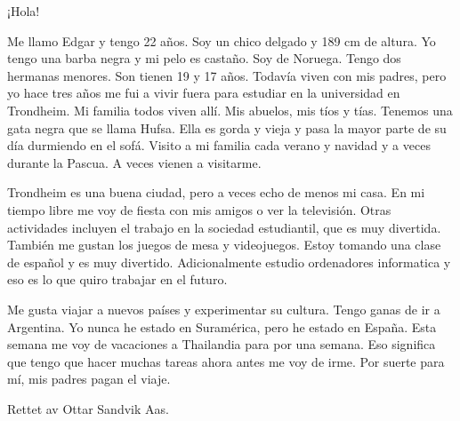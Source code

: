 ¡Hola!

Me llamo Edgar y tengo 22 años. Soy un chico delgado y 189 cm de altura. Yo tengo una barba negra y mi pelo es castaño. Soy de Noruega. Tengo dos hermanas menores. Son tienen 19 y 17 años. Todavía viven con mis padres, pero yo hace tres años me fui a vivir fuera para estudiar en la universidad en Trondheim. Mi familia todos viven allí. Mis abuelos, mis tíos y tías. Tenemos una gata negra que se llama Hufsa. Ella es gorda y vieja y pasa la mayor parte de su día durmiendo en el sofá. Visito a mi familia cada verano y navidad y a veces durante la Pascua. A veces vienen a visitarme.

Trondheim es una buena ciudad, pero a veces echo de menos mi casa. En mi tiempo libre me voy de fiesta con mis amigos o ver la televisión. Otras actividades incluyen el trabajo en la sociedad estudiantil, que es muy divertida. También me gustan los juegos de mesa y videojuegos. Estoy tomando una clase de español y es muy divertido. Adicionalmente estudio ordenadores informatica y eso es lo que quiro trabajar en el futuro. 

Me gusta viajar a nuevos países y experimentar su cultura. Tengo ganas de ir a Argentina. Yo nunca he estado en Suramérica, pero he estado en España. Esta semana me voy de vacaciones a Thailandia para por una semana. Eso significa que tengo que hacer muchas tareas ahora antes me voy de irme. Por suerte para mí, mis padres pagan el viaje. 


\par

Rettet av Ottar Sandvik Aas.

